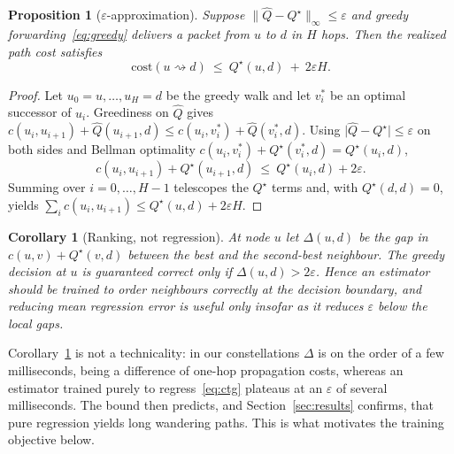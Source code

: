 \documentclass[conference]{IEEEtran}
\newtheorem{proposition}{Proposition}
\newtheorem{corollary}{Corollary}
\begin{document}
\begin{proposition}[$\varepsilon$-approximation]\label{prop:approx}
Suppose $\lVert\hat{Q}-Q^\star\rVert_\infty\le\varepsilon$ and greedy forwarding~\eqref{eq:greedy} delivers a packet from $u$ to $d$ in $H$ hops. Then the realized path cost satisfies
\begin{equation}
\mathrm{cost}(u\rightsquigarrow d)\ \le\ Q^\star(u,d)\ +\ 2\varepsilon H .
\end{equation}
\end{proposition}
\begin{proof}
Let $u_0=u,\dots,u_H=d$ be the greedy walk and let $v^\ast_i$ be an optimal successor of $u_i$. Greediness on $\hat{Q}$ gives $c(u_i,u_{i+1})+\hat{Q}(u_{i+1},d)\le c(u_i,v^\ast_i)+\hat{Q}(v^\ast_i,d)$. Using $\lvert\hat{Q}-Q^\star\rvert\le\varepsilon$ on both sides and Bellman optimality $c(u_i,v^\ast_i)+Q^\star(v^\ast_i,d)=Q^\star(u_i,d)$,
\[
c(u_i,u_{i+1})+Q^\star(u_{i+1},d)\ \le\ Q^\star(u_i,d)+2\varepsilon .
\]
Summing over $i=0,\dots,H-1$ telescopes the $Q^\star$ terms and, with $Q^\star(d,d)=0$, yields $\sum_i c(u_i,u_{i+1})\le Q^\star(u,d)+2\varepsilon H$.
\end{proof}

\begin{corollary}[Ranking, not regression]\label{cor:rank}
At node $u$ let $\Delta(u,d)$ be the gap in $c(u,v)+Q^\star(v,d)$ between the best and the second-best neighbour. The greedy decision at $u$ is guaranteed correct only if $\Delta(u,d)>2\varepsilon$. Hence an estimator should be trained to order neighbours correctly at the decision boundary, and reducing mean regression error is useful only insofar as it reduces $\varepsilon$ below the local gaps.
\end{corollary}

Corollary~\ref{cor:rank} is not a technicality: in our constellations $\Delta$ is on the order of a few milliseconds, being a difference of one-hop propagation costs, whereas an estimator trained purely to regress~\eqref{eq:ctg} plateaus at an $\varepsilon$ of several milliseconds. The bound then predicts, and Section~\ref{sec:results} confirms, that pure regression yields long wandering paths. This is what motivates the training objective below.
\end{document}
